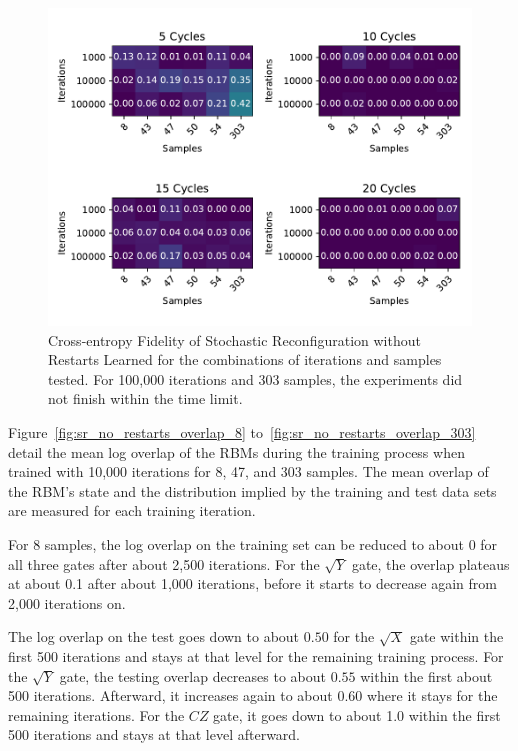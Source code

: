 \begin{figure}[H]
  \centering
  \includegraphics[width=\textwidth]{figures/results/SR-no-restarts-learned/fxeb_heatmap.pdf}
  \caption[Cross-entropy Fidelity of Stochastic Reconfiguration without Restarts Learned]{Cross-entropy Fidelity of Stochastic 
  Reconfiguration without Restarts Learned for the combinations of iterations and samples tested.
  For 100,000 iterations and 303 samples, the experiments did not finish within the time limit.}
  \label{fig:sr_no_restarts_fxeb}
\end{figure}

Figure~\ref{fig:sr_no_restarts_overlap_8} to~\ref{fig:sr_no_restarts_overlap_303} detail the mean log overlap of the RBMs during the 
training process when trained with 10,000 iterations for 8, 47, and 303 samples. The 
mean overlap of the RBM's state and the distribution implied by the training and test data sets are measured 
for each training iteration.

For 8 samples, the log overlap on the training set can be reduced to about 0 for all three gates after about 2,500 iterations.
For the $\sqrt{Y}$ gate, the overlap plateaus at about 0.1 after about 1,000 iterations, before it starts 
to decrease again from 2,000 iterations on. 

The log overlap on the test goes down to about $0.50$ for the $\sqrt{X}$ gate within the first 500 iterations and stays at 
that level for the remaining training process. For the $\sqrt{Y}$ gate, the testing overlap decreases to about 
$0.55$ within the first about 500 iterations. Afterward, it increases again to about 0.60 where it stays for the 
remaining iterations. For the $CZ$ gate, it goes down to about 1.0 within the first 500 iterations and stays at 
that level afterward.

